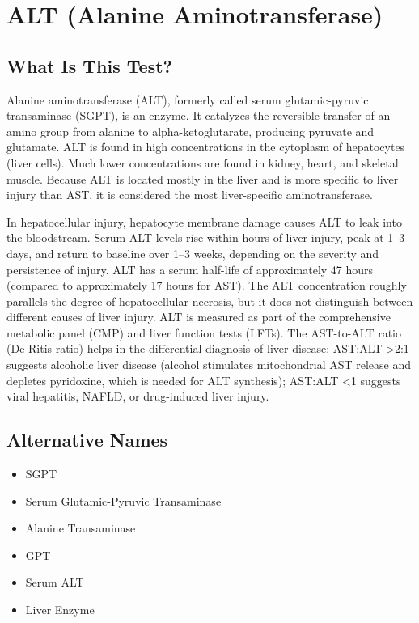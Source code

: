 \chapter{ALT (Alanine Aminotransferase)}

\section*{What Is This Test?}
Alanine aminotransferase (ALT), formerly called serum glutamic-pyruvic transaminase (SGPT), is an enzyme. It catalyzes the reversible transfer of an amino group from alanine to alpha-ketoglutarate, producing pyruvate and glutamate. ALT is found in high concentrations in the cytoplasm of hepatocytes (liver cells). Much lower concentrations are found in kidney, heart, and skeletal muscle. Because ALT is located mostly in the liver and is more specific to liver injury than AST, it is considered the most liver-specific aminotransferase.

In hepatocellular injury, hepatocyte membrane damage causes ALT to leak into the bloodstream. Serum ALT levels rise within hours of liver injury, peak at 1--3 days, and return to baseline over 1--3 weeks, depending on the severity and persistence of injury. ALT has a serum half-life of approximately 47 hours (compared to approximately 17 hours for AST). The ALT concentration roughly parallels the degree of hepatocellular necrosis, but it does not distinguish between different causes of liver injury. ALT is measured as part of the comprehensive metabolic panel (CMP) and liver function tests (LFTs). The AST-to-ALT ratio (De Ritis ratio) helps in the differential diagnosis of liver disease: AST:ALT >2:1 suggests alcoholic liver disease (alcohol stimulates mitochondrial AST release and depletes pyridoxine, which is needed for ALT synthesis); AST:ALT <1 suggests viral hepatitis, NAFLD, or drug-induced liver injury.

\section*{Alternative Names}
\begin{itemize}
  \item SGPT
  \item Serum Glutamic-Pyruvic Transaminase
  \item Alanine Transaminase
  \item GPT
  \item Serum ALT
  \item Liver Enzyme
\end{itemize}
